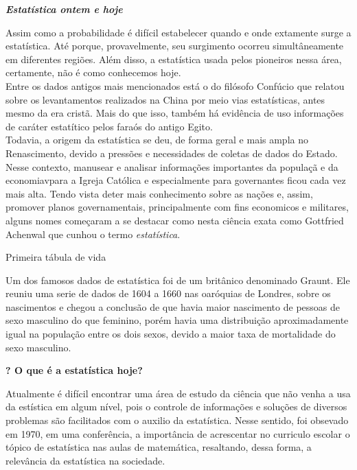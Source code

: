 \documentclass[a4paper,12pt]{article}
\begin{document}
\begin{center}
\huge{\textit{\textbf{Estatística ontem e hoje}}}
\end{center}
Assim como a probabilidade é difícil estabelecer quando e onde extamente surge a estatística. Até porque, provavelmente, seu surgimento ocorreu simultâneamente em  diferentes regiões. Além disso, a estatística usada pelos pioneiros nessa área, certamente, não é como conhecemos hoje.\\
Entre os dados antigos mais mencionados está o do filósofo Confúcio que relatou sobre os levantamentos realizados na China por meio vias estatísticas, antes mesmo da era cristã. Mais do que isso, também há evidência de uso informações de caráter estatítico pelos faraós do antigo Egito.\\
Todavia, a origem da estatística se deu, de forma geral e mais ampla no Renascimento, devido a pressões e necessidades de coletas de dados do Estado. Nesse contexto, manusear e analisar informações importantes  da populaçã e da economiavpara a Igreja Católica e  especialmente para governantes ficou cada vez mais alta. Tendo vista deter mais conhecimento sobre as nações e, assim, promover planos governamentais, principalmente  com fins economicos e militares, alguns nomes começaram a se destacar  como nesta ciência exata como Gottfried Achenwal que cunhou o termo \emph{estatística}.\\
\hline
\begin{center}
    Primeira tábula de vida
\end{center}
Um dos famosos dados de estatística foi de um britânico denominado Graunt. Ele reuniu uma serie de dados de 1604 a 1660 nas oaróquias de Londres, sobre os nascimentos e chegou a conclusão de que havia maior nascimento de pessoas de sexo masculino do que feminino, porém havia uma distribuição aproximadamente igual na população entre os dois sexos, devido a maior taxa de mortalidade do sexo masculino.\\
\hline
\begin{center}
    \textbf{? O que é a estatística hoje?}
\end{center}

 Atualmente é difícil encontrar uma área de estudo da ciência que não venha a usa da estística em algum nível, pois o controle de informações e soluções de diversos problemas são facilitados com o auxilio da estatística.
 Nesse sentido, foi obsevado em 1970, em uma conferência, a importância de acrescentar no curriculo escolar o tópico de estatística nas aulas de matemática, resaltando, dessa forma, a relevância da estatística na sociedade.
 
\end{document}
